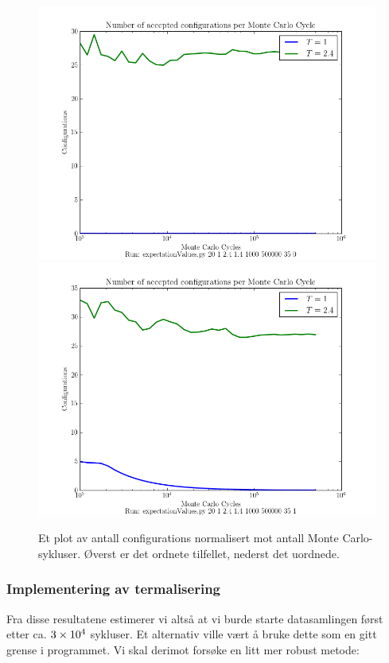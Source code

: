 \documentclass[11pt, twocolumn]{article}
\begin{document}
\begin{figure}[ht]
  \centering
  \includegraphics[scale=0.7]{../fig/configurations.png}
  \includegraphics[scale=0.7]{../fig/configurations_random.png}
  \caption{\label{fig:configurations} Et plot av antall configurations
normalisert mot antall Monte Carlo-sykluser. Øverst er det ordnete tilfellet, nederst det uordnede.}
\end{figure}

\subsubsection{Implementering av termalisering}
\label{subsec:implementering-av-termalisering}
Fra disse resultatene estimerer vi altså at vi burde starte
datasamlingen først etter ca. $3\times 10^{4}$ sykluser. Et alternativ ville vært å bruke
dette som en gitt grense i programmet. Vi skal derimot forsøke en litt
mer robust metode:
\end{document}
